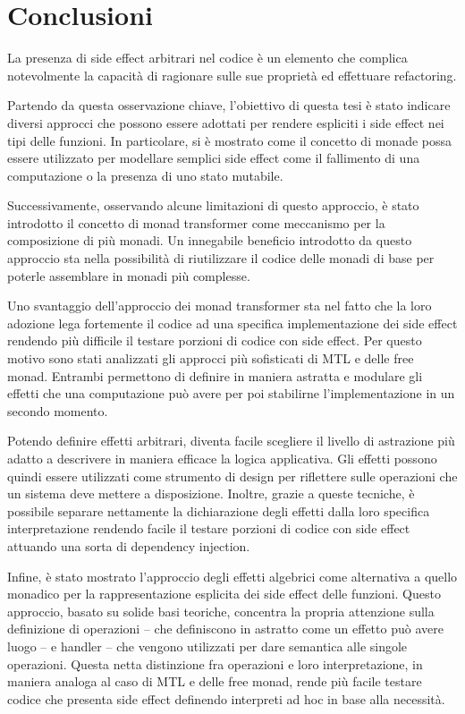 \chapter{Conclusioni}

La presenza di side effect arbitrari nel codice è un elemento che complica notevolmente la capacità di ragionare sulle sue proprietà ed effettuare refactoring.

Partendo da questa osservazione chiave, l'obiettivo di questa tesi è stato indicare diversi approcci che possono essere adottati per rendere espliciti i side effect nei tipi delle funzioni.
In particolare, si è mostrato come il concetto di monade possa essere utilizzato per modellare semplici side effect come il fallimento di una computazione o la presenza di uno stato mutabile.

Successivamente, osservando alcune limitazioni di questo approccio, è stato introdotto il concetto di monad transformer come meccanismo per la composizione di più monadi.
Un innegabile beneficio introdotto da questo approccio sta nella possibilità di riutilizzare il codice delle monadi di base per poterle assemblare in monadi più complesse.

Uno svantaggio dell'approccio dei monad transformer sta nel fatto che la loro adozione lega fortemente il codice ad una specifica implementazione dei side effect rendendo più difficile il testare porzioni di codice con side effect.
Per questo motivo sono stati analizzati gli approcci più sofisticati di MTL e delle free monad.
Entrambi permettono di definire in maniera astratta e modulare gli effetti che una computazione può avere per poi stabilirne l'implementazione in un secondo momento.

Potendo definire effetti arbitrari, diventa facile scegliere il livello di astrazione più adatto a descrivere in maniera efficace la logica applicativa.
Gli effetti possono quindi essere utilizzati come strumento di design per riflettere sulle operazioni che un sistema deve mettere a disposizione.
Inoltre, grazie a queste tecniche, è possibile separare nettamente la dichiarazione degli effetti dalla loro specifica interpretazione rendendo facile il testare porzioni di codice con side effect attuando una sorta di dependency injection.

Infine, è stato mostrato l'approccio degli effetti algebrici come alternativa a quello monadico per la rappresentazione esplicita dei side effect delle funzioni.
Questo approccio, basato su solide basi teoriche, concentra la propria attenzione sulla definizione di operazioni -- che definiscono in astratto come un effetto può avere luogo -- e handler -- che vengono utilizzati per dare semantica alle singole operazioni.
Questa netta distinzione fra operazioni e loro interpretazione, in maniera analoga al caso di MTL e delle free monad, rende più facile testare codice che presenta side effect definendo interpreti ad hoc in base alla necessità.


